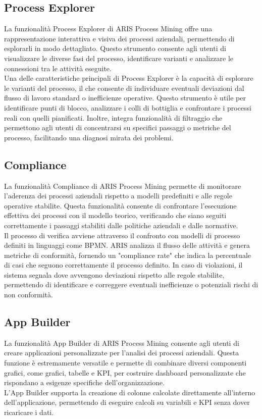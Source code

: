 \documentclass{article}
\begin{document}
\subsection{Process Explorer}
La funzionalità Process Explorer di ARIS Process Mining offre una rappresentazione interattiva e visiva dei processi aziendali, permettendo di esplorarli in modo dettagliato. Questo strumento consente agli utenti di visualizzare le diverse fasi del processo, identificare varianti e analizzare le connessioni tra le attività eseguite.\\
Una delle caratteristiche principali di Process Explorer è la capacità di esplorare le varianti del processo, il che consente di individuare eventuali deviazioni dal flusso di lavoro standard o inefficienze operative. Questo strumento è utile per identificare punti di blocco, analizzare i colli di bottiglia e confrontare i processi reali con quelli pianificati. Inoltre, integra funzionalità di filtraggio che permettono agli utenti di concentrarsi su specifici passaggi o metriche del processo, facilitando una diagnosi mirata dei problemi.
\subsection{Compliance}
La funzionalità Compliance di ARIS Process Mining permette di monitorare l'aderenza dei processi aziendali rispetto a modelli predefiniti e alle regole operative stabilite. Questa funzionalità consente di confrontare l'esecuzione effettiva dei processi con il modello teorico, verificando che siano seguiti correttamente i passaggi stabiliti dalle politiche aziendali e dalle normative.\\
Il processo di verifica avviene attraverso il confronto con modelli di processo definiti in linguaggi come BPMN. ARIS analizza il flusso delle attività e genera metriche di conformità, fornendo un "compliance rate" che indica la percentuale di casi che seguono correttamente il processo definito. In caso di violazioni, il sistema segnala dove avvengono deviazioni rispetto alle regole stabilite, permettendo di identificare e correggere eventuali inefficienze o potenziali rischi di non conformità.
\subsection{App Builder}
La funzionalità App Builder di ARIS Process Mining consente agli utenti di creare applicazioni personalizzate per l'analisi dei processi aziendali. Questa funzione è estremamente versatile e permette di combinare diversi componenti grafici, come grafici, tabelle e KPI, per costruire dashboard personalizzate che rispondano a esigenze specifiche dell'organizzazione.\\
L'App Builder supporta la creazione di colonne calcolate direttamente all'interno dell'applicazione, permettendo di eseguire calcoli su variabili e KPI senza dover ricaricare i dati.
\end{document}
